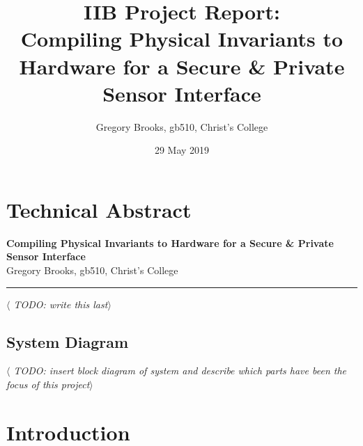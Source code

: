 \documentclass[12pt]{article}
\begin{document}

\clearpage \mbox{}
\clearpage
{}

\noindent

%
%

\title
{
  IIB Project Report:\\
  Compiling Physical Invariants to Hardware for a Secure \& Private Sensor Interface\\
}
\author{Gregory Brooks, gb510, Christ's College}
\date{29 May 2019}
\maketitle

\tableofcontents

\clearpage
{}

%
%
\pagestyle{technical_abstract}
\section{Technical Abstract}

\begin{center}
{
  \bf Compiling Physical Invariants to Hardware for a Secure \& Private Sensor Interface\\
}
Gregory Brooks, gb510, Christ's College
\end{center}
\rule{15.7cm}{0.5mm}
\vspace{1cm}

\textit{$\langle$ TODO: write this last$\rangle$}


  \subsection{System Diagram}
    \textit{$\langle$ TODO: insert block diagram of system and describe which parts have been the focus of this project$\rangle$}


\newpage


\pagestyle{default}
%
%

\section{Introduction}

\newpage



%
%
\end{document}
